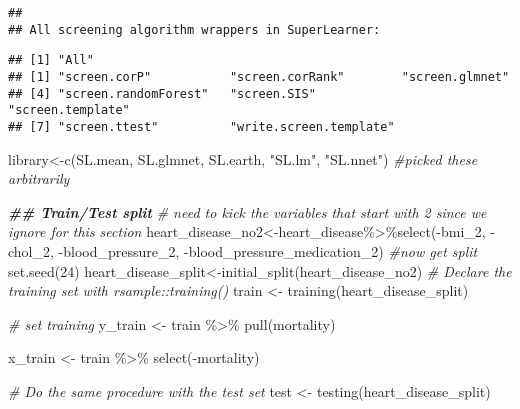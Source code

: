 \documentclass[
]{article}
\newenvironment{Shaded}{\begin{snugshade}}{\end{snugshade}}
\newcommand{\CommentTok}[1]{\textcolor[rgb]{0.56,0.35,0.01}{\textit{#1}}}
\newcommand{\DecValTok}[1]{\textcolor[rgb]{0.00,0.00,0.81}{#1}}
\newcommand{\DocumentationTok}[1]{\textcolor[rgb]{0.56,0.35,0.01}{\textbf{\textit{#1}}}}
\newcommand{\FunctionTok}[1]{\textcolor[rgb]{0.00,0.00,0.00}{#1}}
\newcommand{\NormalTok}[1]{#1}
\newcommand{\OtherTok}[1]{\textcolor[rgb]{0.56,0.35,0.01}{#1}}
\newcommand{\SpecialCharTok}[1]{\textcolor[rgb]{0.00,0.00,0.00}{#1}}
\newcommand{\StringTok}[1]{\textcolor[rgb]{0.31,0.60,0.02}{#1}}
\begin{document}
\begin{verbatim}
## 
## All screening algorithm wrappers in SuperLearner:
\end{verbatim}

\begin{verbatim}
## [1] "All"
## [1] "screen.corP"           "screen.corRank"        "screen.glmnet"        
## [4] "screen.randomForest"   "screen.SIS"            "screen.template"      
## [7] "screen.ttest"          "write.screen.template"
\end{verbatim}

\begin{Shaded}
\begin{Highlighting}[]
\NormalTok{library}\OtherTok{\textless{}{-}}\FunctionTok{c}\NormalTok{(}\StringTok{\textquotesingle{}SL.mean\textquotesingle{}}\NormalTok{, }\StringTok{\textquotesingle{}SL.glmnet\textquotesingle{}}\NormalTok{, }\StringTok{\textquotesingle{}SL.earth\textquotesingle{}}\NormalTok{, }\StringTok{"SL.lm"}\NormalTok{, }\StringTok{"SL.nnet"}\NormalTok{) }\CommentTok{\#picked these arbitrarily}

\DocumentationTok{\#\# Train/Test split}
\CommentTok{\# need to kick the variables that start with 2 since we ignore for this section}
\NormalTok{heart\_disease\_no2}\OtherTok{\textless{}{-}}\NormalTok{heart\_disease}\SpecialCharTok{\%\textgreater{}\%}\FunctionTok{select}\NormalTok{(}\SpecialCharTok{{-}}\NormalTok{bmi\_2, }\SpecialCharTok{{-}}\NormalTok{chol\_2, }\SpecialCharTok{{-}}\NormalTok{blood\_pressure\_2, }\SpecialCharTok{{-}}\NormalTok{blood\_pressure\_medication\_2)}
\CommentTok{\#now get split}
\FunctionTok{set.seed}\NormalTok{(}\DecValTok{24}\NormalTok{)}
\NormalTok{heart\_disease\_split}\OtherTok{\textless{}{-}}\FunctionTok{initial\_split}\NormalTok{(heart\_disease\_no2)}
\CommentTok{\# Declare the training set with rsample::training()}
\NormalTok{train }\OtherTok{\textless{}{-}} \FunctionTok{training}\NormalTok{(heart\_disease\_split)}

\CommentTok{\# set training}
\NormalTok{y\_train }\OtherTok{\textless{}{-}}\NormalTok{ train }\SpecialCharTok{\%\textgreater{}\%} 
  \FunctionTok{pull}\NormalTok{(mortality) }

\NormalTok{x\_train }\OtherTok{\textless{}{-}}\NormalTok{ train }\SpecialCharTok{\%\textgreater{}\%}
  \FunctionTok{select}\NormalTok{(}\SpecialCharTok{{-}}\NormalTok{mortality)}

\CommentTok{\# Do the same procedure with the test set}
\NormalTok{test }\OtherTok{\textless{}{-}} \FunctionTok{testing}\NormalTok{(heart\_disease\_split)}


\end{Highlighting}
\end{Shaded}
\end{document}
